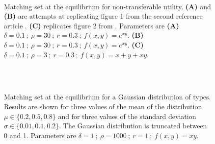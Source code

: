 \begin{figure}[!ht]
	\centering
	\quad
	\\
	\caption{Matching set at the equilibrium for non-transferable utility. \textbf{(A)} and \textbf{(B)} are attempts at replicating figure 1 from the second reference article \citep{smith_marriage_2006}. \textbf{(C)} replicates figure 2 from \citep{smith_marriage_2006}. Parameters are \textbf{(A)} $\delta=0.1 \ ; \ \rho=30 \ ; \ r=0.3 \ ; \ f(x,y)=e^{xy}$. \textbf{(B)} $\delta=0.1 \ ; \ \rho=30 \ ; \ r=0.3 \ ; \ f(x,y)=e^{xy}$. \textbf{(C)} $\delta=0.1 \ ; \ \rho=3 \ ; \ r=0.3 \ ; \ f(x,y)=x+y+xy$.}
	\label{fig:fig3}
\end{figure}
 




\begin{figure}[!ht]
	\centering
	\quad
	\quad
	\quad
	\\
	\quad
	\quad
	\quad
	\\
	\quad
	\quad
	\quad
	\caption{Matching set at the equilibrium for a Gaussian distribution of types. Results are shown for three values of the mean of the distribution $\mu \in \{0.2,0.5,0.8\}$ and for three values of the standard deviation $\sigma \in \{0.01,0.1,0.2\}$. The Gaussian distribution is truncated between 0 and 1. Parameters are $\delta=1 \ ; \ \rho=1000 \ ; \ r=1 \ ; \ f(x,y)=xy$.}
	\label{fig:fig4}
\end{figure}




